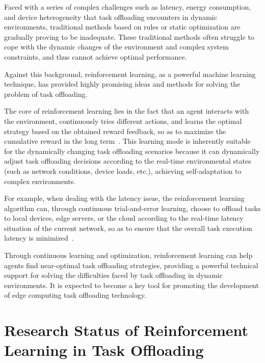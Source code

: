 \documentclass[journal]{IEEEtran}
\begin{document}
Faced with a series of complex challenges such as latency, energy consumption, and device heterogeneity that task offloading encounters in dynamic environments, 
traditional methods based on rules or static optimization are gradually proving to be inadequate. These traditional methods often struggle to cope with the dynamic changes of the environment and complex system constraints, and thus cannot achieve optimal performance.

Against this background, reinforcement learning, as a powerful machine learning technique, has provided highly promising ideas and methods for solving the problem of task offloading.

The core of reinforcement learning lies in the fact that an agent interacts with the environment, 
continuously tries different actions, and learns the optimal strategy based on the obtained reward feedback, 
so as to maximize the cumulative reward in the long term~\cite{zheng05}. 
This learning mode is inherently suitable for the dynamically changing task offloading scenarios 
because it can dynamically adjust task offloading decisions according to the real-time environmental states 
(such as network conditions, device loads, etc.), achieving self-adaptation to complex environments.

For example, when dealing with the latency issue, the reinforcement learning algorithm can, through continuous trial-and-error learning, choose to offload tasks to local devices, edge servers, or the cloud according to the real-time latency situation of the current network, so as to ensure that the overall task execution latency is minimized~\cite{zheng06}.

Through continuous learning and optimization, reinforcement learning can help agents find near-optimal task offloading strategies, providing a powerful technical support for solving the difficulties faced by task offloading in dynamic environments. It is expected to become a key tool for promoting the development of edge computing task offloading technology.

\section{Research Status of Reinforcement Learning in Task Offloading}
\end{document}
